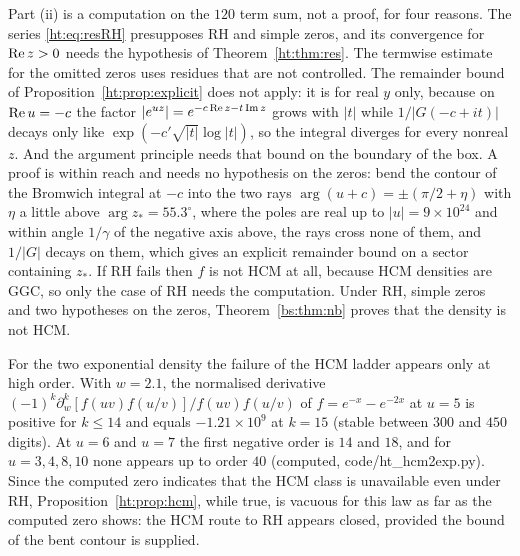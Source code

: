 Part (ii) is a computation on the $120$ term sum, not a proof, for four reasons. The series \eqref{ht:eq:resRH} presupposes RH and simple zeros, and its convergence for $\operatorname{Re} z>0$ needs the hypothesis of Theorem~\ref{ht:thm:res}. The termwise estimate for the omitted zeros uses residues that are not controlled. The remainder bound of Proposition~\ref{ht:prop:explicit} does not apply: it is for real $y$ only, because on $\operatorname{Re} u=-c$ the factor $|e^{uz}|=e^{-c\operatorname{Re} z-t\operatorname{Im} z}$ grows with $|t|$ while $1/|G(-c+it)|$ decays only like $\exp(-c'\sqrt{|t|}\log|t|)$, so the integral diverges for every nonreal $z$. And the argument principle needs that bound on the boundary of the box. A proof is within reach and needs no hypothesis on the zeros: bend the contour of the Bromwich integral at $-c$ into the two rays $\arg(u+c)=\pm(\pi/2+\eta)$ with $\eta$ a little above $\arg z_*=55.3^\circ$, where the poles are real up to $|u|=9\times10^{24}$ and within angle $1/\gamma$ of the negative axis above, the rays cross none of them, and $1/|G|$ decays on them, which gives an explicit remainder bound on a sector containing $z_*$. If RH fails then $f$ is not HCM at all, because HCM densities are GGC, so only the case of RH needs the computation. Under RH, simple zeros and two hypotheses on the zeros, Theorem~\ref{bs:thm:nb} proves that the density is not HCM.

For the two exponential density the failure of the HCM ladder appears only at high order. With $w=2.1$, the normalised derivative $(-1)^k\partial_w^k[f(uv)f(u/v)]/f(uv)f(u/v)$ of $f=e^{-x}-e^{-2x}$ at $u=5$ is positive for $k\le14$ and equals $-1.21\times10^9$ at $k=15$ (stable between $300$ and $450$ digits). At $u=6$ and $u=7$ the first negative order is $14$ and $18$, and for $u=3,4,8,10$ none appears up to order $40$ (computed, code/ht\_hcm2exp.py). Since the computed zero indicates that the HCM class is unavailable even under RH, Proposition~\ref{ht:prop:hcm}, while true, is vacuous for this law as far as the computed zero shows: the HCM route to RH appears closed, provided the bound of the bent contour is supplied.

